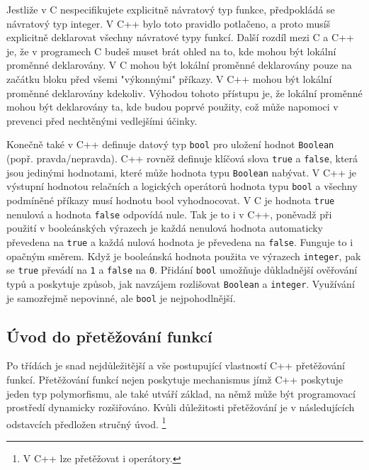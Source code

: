       Jestliže v C nespecifikujete explicitně návratový typ funkce, předpokládá se návratový typ 
      integer. V C++ bylo toto pravidlo potlačeno, a proto musíš explicitně deklarovat všechny 
      návratové typy funkcí. Další rozdíl mezi C a C++ je, že v programech C budeš muset brát ohled 
      na to, kde mohou být lokální proměnné deklarovány. V C mohou být lokální proměnné deklarovány 
      pouze na začátku bloku před všemi "výkonnými" příkazy. V C++ mohou být lokální proměnné 
      deklarovány kdekoliv. Výhodou tohoto přístupu je, že lokální proměnné mohou být deklarovány 
      ta, kde budou poprvé použity, což může napomoci v prevenci před nechtěnými vedlejšími účinky.
  
      Konečně také v C++ definuje datový typ \lstinline[basicstyle=\ttfamily]!bool! pro uložení  
      hodnot \lstinline[basicstyle=\ttfamily]!Boolean! (popř. pravda/nepravda). C++ rovněž definuje 
      klíčová slova \lstinline[basicstyle=\ttfamily]!true! a   
      \lstinline[basicstyle=\ttfamily]!false!, 
      která jsou jedinými hodnotami, které může hodnota typu 
      \lstinline[basicstyle=\ttfamily]!Boolean! nabývat. V C++ je výstupní hodnotou relačních a 
      logických operátorů hodnota typu \lstinline[basicstyle=\ttfamily]!bool! a všechny 
      podmíněné příkazy musí hodnotu bool vyhodnocovat. V C je hodnota 
      \lstinline[basicstyle=\ttfamily]!true! nenulová a hodnota 
      \lstinline[basicstyle=\ttfamily]!false! odpovídá nule. Tak je to i v C++, poněvadž při 
      použití v booleánských výrazech je každá nenulová hodnota automaticky převedena na    
      \lstinline[basicstyle=\ttfamily]!true! a každá nulová hodnota je převedena na 
      \lstinline[basicstyle=\ttfamily]!false!. Funguje to i opačným směrem. Když je booleánská 
      hodnota použita ve výrazech \lstinline[basicstyle=\ttfamily]!integer!, pak se 
      \lstinline[basicstyle=\ttfamily]!true! převádí na \lstinline[basicstyle=\ttfamily]!1! a 
      \lstinline[basicstyle=\ttfamily]!false! na \lstinline[basicstyle=\ttfamily]!0!. Přidání 
      \lstinline[basicstyle=\ttfamily]!bool! umožňuje důkladnější ověřování typů a poskytuje 
      způsob, jak navzájem rozlišovat \lstinline[basicstyle=\ttfamily]!Boolean! a     
      \lstinline[basicstyle=\ttfamily]!integer!. Využívání je samozřejmě nepovinné, ale
      \lstinline[basicstyle=\ttfamily]!bool! je nejpohodlnější.
  
    \subsection{Úvod do přetěžování funkcí}
      Po třídách je snad nejdůležitější a vše postupující vlastností C++ přetě\-žování funkcí. 
      Přetěžování funkcí nejen poskytuje mechanismus jímž C++ poskytuje jeden typ polymorfismu, ale 
      také utváří základ, na němž může být programovací prostředí dynamicky rozšiřováno. Kvůli 
      důležitosti přetěžování je v následujících odstavcích předložen stručný úvod. \footnote{V C++ 
      lze přetěžovat i operátory.}
  
